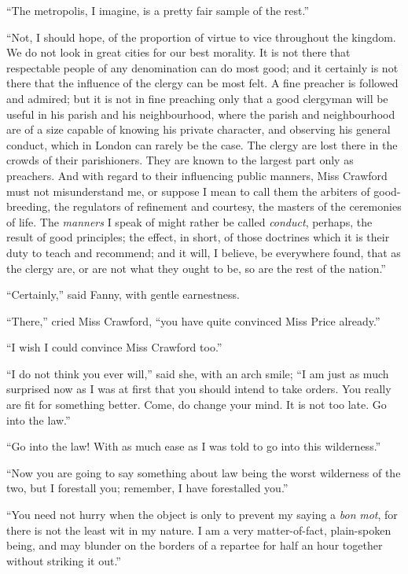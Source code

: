 ``The metropolis, I imagine, is a pretty fair sample
of the rest.''

``Not, I should hope, of the proportion of virtue to vice
throughout the kingdom.  We do not look in great cities
for our best morality.  It is not there that respectable
people of any denomination can do most good; and it
certainly is not there that the influence of the clergy can
be most felt.  A fine preacher is followed and admired;
but it is not in fine preaching only that a good clergyman
will be useful in his parish and his neighbourhood,
where the parish and neighbourhood are of a size capable
of knowing his private character, and observing his
general conduct, which in London can rarely be the case.
The clergy are lost there in the crowds of their parishioners.
They are known to the largest part only as preachers.
And with regard to their influencing public manners,
Miss Crawford must not misunderstand me, or suppose I mean
to call them the arbiters of good-breeding, the regulators
of refinement and courtesy, the masters of the ceremonies
of life.  The \emph{manners} I speak of might rather be
called \emph{conduct}, perhaps, the result of good principles;
the effect, in short, of those doctrines which it
is their duty to teach and recommend; and it will,
I believe, be everywhere found, that as the clergy are,
or are not what they ought to be, so are the rest of
the nation.''

``Certainly,'' said Fanny, with gentle earnestness.

``There,'' cried Miss Crawford, ``you have quite convinced
Miss Price already.''

``I wish I could convince Miss Crawford too.''

``I do not think you ever will,'' said she, with an arch smile;
``I am just as much surprised now as I was at first
that you should intend to take orders.  You really are
fit for something better.  Come, do change your mind.
It is not too late.  Go into the law.''

``Go into the law!  With as much ease as I was told to go
into this wilderness.''

``Now you are going to say something about law being
the worst wilderness of the two, but I forestall you;
remember, I have forestalled you.''

``You need not hurry when the object is only to prevent
my saying a \emph{bon} \emph{mot}, for there is not the least wit in
my nature.  I am a very matter-of-fact, plain-spoken being,
and may blunder on the borders of a repartee for half
an hour together without striking it out.''

